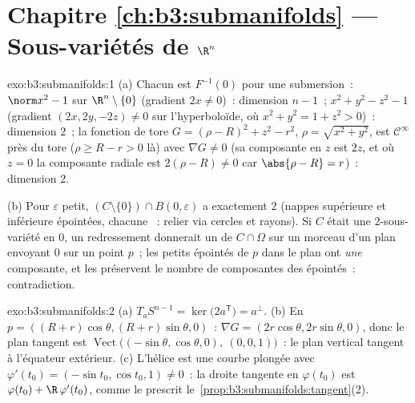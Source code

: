 \section*{Chapitre \ref{ch:b3:submanifolds} --- Sous-variétés de
$\R^n$}

\begin{solution}{exo:b3:submanifolds:1}
(a) Chacun est $F^{-1}(0)$ pour une submersion~: $\norm x^2 -
1$ sur $\R^n\setminus\{0\}$ (gradient $2x \neq 0$)~:
dimension $n-1$~; $x^2 + y^2 - z^2 - 1$ (gradient $(2x, 2y,
-2z) \neq 0$ sur l'hyperboloïde, où $x^2 + y^2 = 1 + z^2 >
0$)~: dimension $2$~; la fonction de tore $G = (\rho - R)^2
+ z^2 - r^2$, $\rho = \sqrt{x^2+y^2}$, est $\mathcal
C^\infty$ près du tore ($\rho \geq R - r > 0$ là) avec
$\nabla G \neq 0$ (sa composante en $z$ est $2z$, et où $z =
0$ la composante radiale est $2(\rho - R)\ne0$ car
$\abs{\rho - R} = r$)~: dimension $2$.

(b) Pour $\varepsilon$ petit,
$(C\setminus\{0\})\cap B(0,\varepsilon)$ a exactement $2$
 (nappes supérieure et inférieure
épointées, chacune ~: relier via cercles et
rayons). Si $C$ était une $2$-sous-variété en $0$, un
redressement donnerait un  de $C\cap\Omega$ sur
un morceau  d'un plan envoyant $0$ sur un point $p$~;
les petits  épointés de $p$ dans le plan ont
\emph{une} composante, et les  préservent le
nombre de composantes des  épointés~:
contradiction.
\end{solution}

\begin{solution}{exo:b3:submanifolds:2}
(a) $T_aS^{n-1} = \ker\bigl(2a^{\mathsf T}\bigr) =
a^\perp$.
(b) En $p = ((R+r)\cos\theta, (R+r)\sin\theta, 0)$~: $\nabla
G = (2r\cos\theta, 2r\sin\theta, 0)$, donc le plan tangent
est $\operatorname{Vect}\bigl((-\sin\theta, \cos\theta, 0),\
(0, 0, 1)\bigr)$~: le plan vertical tangent à l'équateur
extérieur.
(c) L'hélice est une courbe plongée avec $\varphi'(t_0) =
(-\sin t_0, \cos t_0, 1) \neq 0$~: la droite tangente en
$\varphi(t_0)$ est $\varphi(t_0) + \R\,\varphi'(t_0)$, comme
le prescrit le~\cref{prop:b3:submanifolds:tangent}(2).
\end{solution}

